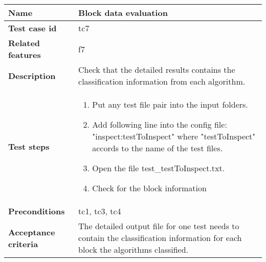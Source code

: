	\begin{tabular}{ | p{3.5cm} | p{12cm} |}
	\hline
	\textbf{Name} 					& Block data evaluation 		\\ 	\hline
	\textbf{Test case id} 			& tc7						\\ 	\hline
	\textbf{Related features}		& f7						\\ 	\hline
	\textbf{Description} 			& Check that the detailed results contains the classification information from each algorithm.	\\ 	\hline
	\textbf{Test steps} 			& 	\begin{enumerate}
											\item{Put any test file pair into the input folders.}
											\item{Add following line into the config file: "inspect:testToInspect" where "testToInspect" accords to the name of the test files. }
											\item{Open the file test\_testToInspect.txt.}
											\item{Check for the block information}
										\end{enumerate}
																\\ 	\hline
	\textbf{Preconditions} 			& tc1, tc3, tc4				\\ 	\hline
	\textbf{Acceptance criteria} 	& The detailed output file for one test needs to contain the classification information for each block the algorithms classified.	\\ 	\hline
	\end{tabular} \\